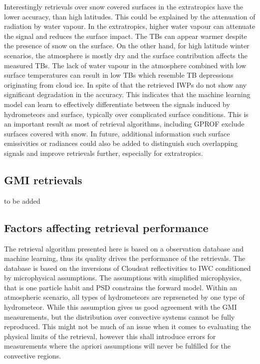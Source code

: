 \documentclass[amt, manuscript]{copernicus}
\newcommand{\todo}[1]{{\color{red} #1}}
\begin{document}
Interestingly retrievals over snow covered surfaces in the extratropics have the lower accuracy, than high latitudes. This could be explained by the attenuation of radiation by water vapour. In the extratropics, higher water vapour can attenuate the signal and reduces the surface impact. The TBs can appear warmer despite the presence of snow on the surface.  On the other hand, for high latitude winter scenarios, the atmosphere is mostly dry and the surface contribution affects the measured TBs. The lack of water vapour in the atmosphere combined with low surface temperatures can result in low TBs which resemble TB depressions originating from cloud ice. In spite of that the retrieved IWPs do not show any significant degradation in the accuracy. This indicates that the machine learning model can learn to effectively differentiate between the signals induced by hydrometeors and surface, typically over complicated surface conditions. This is an important result as most of retrieval algorithms, including GPROF exclude surfaces covered with snow. In future, additional information such  surface emissivities or radiances could also be added to distinguish such overlapping signals and improve retrievals further, especially for extratropics.  

\subsection{GMI retrievals}
%
\todo{to be added}

\subsection{Factors affecting retrieval performance}
%
The retrieval algorithm presented here is based on a observation database and machine learning, thus its quality drives the performance of the retrievals. The database is based on the inversions of Cloudsat reflectivities to IWC conditioned by microphysical assumptions. The assumptions with simplified microphysics, that is one particle habit and PSD constrains the forward model. Within an atmospheric scenario, all types of hydrometeors are reprseneted by one type of hydrometeor. While this assumption gives us good agreement with the GMI measurements, but the distribution over convective systems cannot be fully reproduced. This might not be much of an issue when it comes to evaluating the physical limits of the retrieval, however this shall introduce errors for measurements where the apriori assumptions will never be fulfilled for the convective regions.
\end{document}
